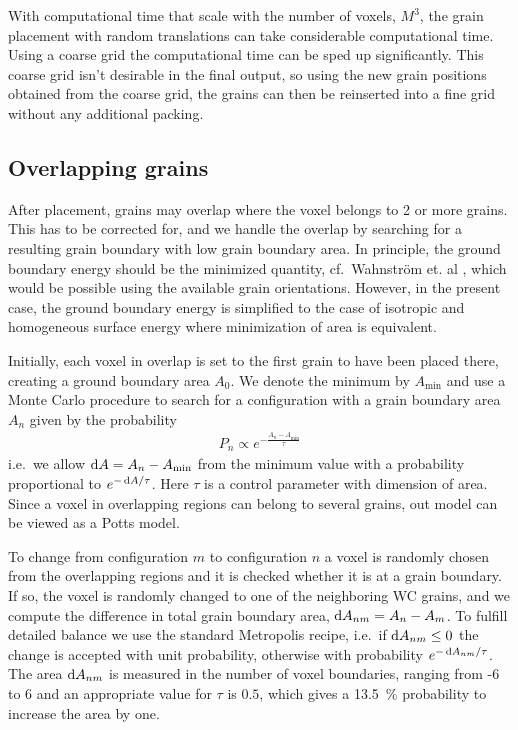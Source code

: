 \documentclass[3p,12pt]{elsarticle}
\begin{document}
With computational time that scale with the number of voxels, $M^3$, the grain placement with random translations can take considerable computational time.
Using a coarse grid the computational time can be sped up significantly.
This coarse grid isn't desirable in the final output, so using the new grain positions obtained from the coarse grid, the grains can then be reinserted into a fine grid without any additional packing.

\subsection{Overlapping grains}\label{sec:overlapping_grains}

After placement, grains may overlap where the voxel belongs to 2 or more grains.
This has to be corrected for, and we handle the overlap by searching for a resulting grain boundary with low grain boundary area.
In principle, the ground boundary energy should be the minimized quantity, cf.\ Wahnström et. al \cite{????_wahnstrom_20??}, which would be possible using the available grain orientations.
However, in the present case, the ground boundary energy is simplified to the case of isotropic and homogeneous surface energy where minimization of area is equivalent.

Initially, each voxel in overlap is set to the first grain to have been placed there, creating a ground boundary area $A_0$.
We denote the minimum by $A_\text{min}$ and use a Monte Carlo procedure to search for a configuration with a grain boundary area $A_n$ given by the probability
\begin{align}
 P_n \propto e^{-\frac{A_n - A_\text{min}}{\tau}}
\end{align}
i.e.\ we allow $\operatorname{d \!} A = A_n - A_\text{min}$ from the minimum value with a probability proportional to $e^{-\operatorname{d \!} A / \tau}$.
Here $\tau$ is a control parameter with dimension of area.
Since a voxel in overlapping regions can belong to several grains, out model can be viewed as a Potts model.

To change from configuration $m$ to configuration $n$ a voxel is randomly chosen from the overlapping regions and it is checked whether it is at a grain boundary.
If so, the voxel is randomly changed to one of the neighboring WC grains, and we compute the difference in total grain boundary area, $\operatorname{d \!} A_{nm} = A_n - A_m$.
To fulfill detailed balance we use the standard Metropolis recipe, i.e.\ if $\operatorname{d \!} A_{nm} \leq 0$ the change is accepted with unit probability, otherwise with probability $e^{-\operatorname{d \!} A_{nm}/\tau}$.
The area $\operatorname{d \!} A_{nm}$ is measured in the number of voxel boundaries, ranging from -6 to 6 and an appropriate value for $\tau$ is $0.5$, which gives a \SI{13.5}{\percent} probability to increase the area by one.
\end{document}
